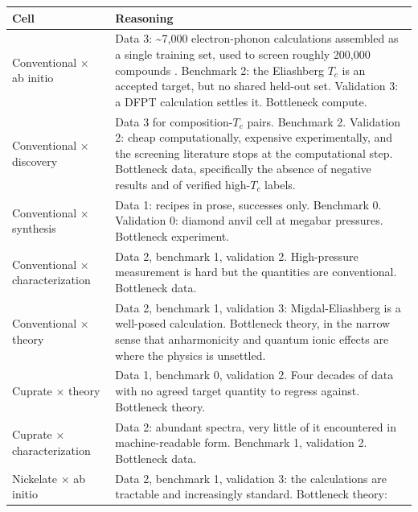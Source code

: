 \documentclass[
  11pt,
]{article}
\newcounter{none} %
\begin{document}
{\def\LTcaptype{none} %
\begin{longtable}[]{@{}
  >{\raggedright\arraybackslash}p{}
  >{\raggedright\arraybackslash}p{}@{}}
\toprule\noalign{}
\begin{minipage}[b]{\linewidth}\raggedright
Cell
\end{minipage} & \begin{minipage}[b]{\linewidth}\raggedright
Reasoning
\end{minipage} \\
\midrule\noalign{}
\endhead
\bottomrule\noalign{}
\endlastfoot
Conventional × ab initio & Data 3: \textasciitilde7,000 electron-phonon
calculations assembled as a single training set, used to screen roughly
200,000 compounds \citep{cerqueira2023sampling}. Benchmark 2: the
Eliashberg \(T_c\) is an accepted target, but no shared held-out set.
Validation 3: a DFPT calculation settles it. Bottleneck compute. \\
Conventional × discovery & Data 3 for composition-\(T_c\) pairs.
Benchmark 2. Validation 2: cheap computationally, expensive
experimentally, and the screening literature stops at the computational
step. Bottleneck data, specifically the absence of negative results and
of verified high-\(T_c\) labels. \\
Conventional × synthesis & Data 1: recipes in prose, successes only.
Benchmark 0. Validation 0: diamond anvil cell at megabar pressures.
Bottleneck experiment. \\
Conventional × characterization & Data 2, benchmark 1, validation 2.
High-pressure measurement is hard but the quantities are conventional.
Bottleneck data. \\
Conventional × theory & Data 2, benchmark 1, validation 3:
Migdal-Eliashberg is a well-posed calculation. Bottleneck theory, in the
narrow sense that anharmonicity and quantum ionic effects are where the
physics is unsettled. \\
Cuprate × theory & Data 1, benchmark 0, validation 2. Four decades of
data with no agreed target quantity to regress against. Bottleneck
theory. \\
Cuprate × characterization & Data 2: abundant spectra, very little of it
encountered in machine-readable form. Benchmark 1, validation 2.
Bottleneck data. \\
Nickelate × ab initio & Data 2, benchmark 1, validation 3: the
calculations are tractable and increasingly standard. Bottleneck theory:

\end{longtable}}
\end{document}
